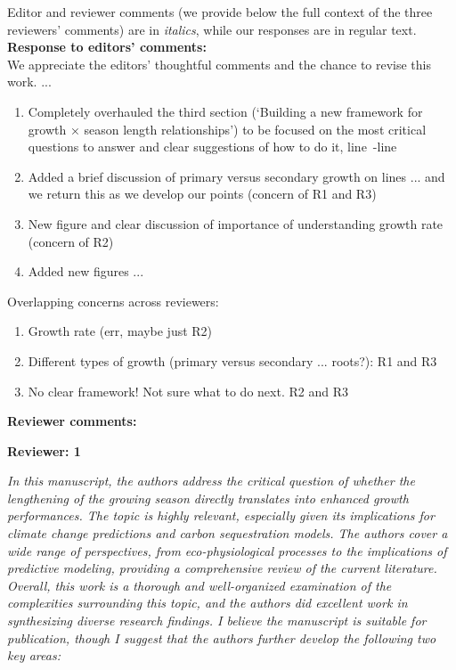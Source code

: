 \documentclass[11pt]{article}
\newcommand{\lr}[1]{line~\lineref{#1}}
\begin{document}
\setlength{\parindent}{0cm}
\setlength{\parskip}{7pt}


\renewcommand{\refname}{\CHead{}}

Editor and reviewer comments (we provide below the full context of the three reviewers' comments) are in \emph{italics}, while our responses are in regular text. \\ 

{\bf Response to editors' comments:} \\  %

We appreciate the editors' thoughtful comments and the chance to revise this work. ...

\begin{enumerate}
\item Completely overhauled the third section (`Building a new framework for growth × season length relationships') to be focused on the most critical questions to answer and clear suggestions of how to do it, \lr{startframework}-\lr{R3complaint1E}
\item Added a brief discussion of primary versus secondary growth on lines ...  and we return this as we develop our points  (concern of R1 and R3) 
\item New figure and clear discussion of importance of understanding growth rate (concern of R2) 
\item Added new figures ... 
\end{enumerate}

Overlapping concerns across reviewers:
\begin{enumerate}
\item Growth rate (err, maybe just R2) 
\item Different types of growth (primary versus secondary ... roots?):  R1 and R3
\item No clear framework! Not sure what to do next. R2 and R3 
\end{enumerate}

{\bf Reviewer comments:} 

{\bf Reviewer: 1}


\emph{In this manuscript, the authors address the critical question of whether the lengthening of the growing season directly translates into enhanced growth performances. The topic is highly relevant, especially given its implications for climate change predictions and carbon sequestration models. The authors cover a wide range of perspectives, from eco-physiological processes to the implications of predictive modeling, providing a comprehensive review of the current literature. Overall, this work is a thorough and well-organized examination of the complexities surrounding this topic, and the authors did excellent work in synthesizing diverse research findings. I believe the manuscript is suitable for publication, though I suggest that the authors further develop the following two key areas:}
\end{document}
